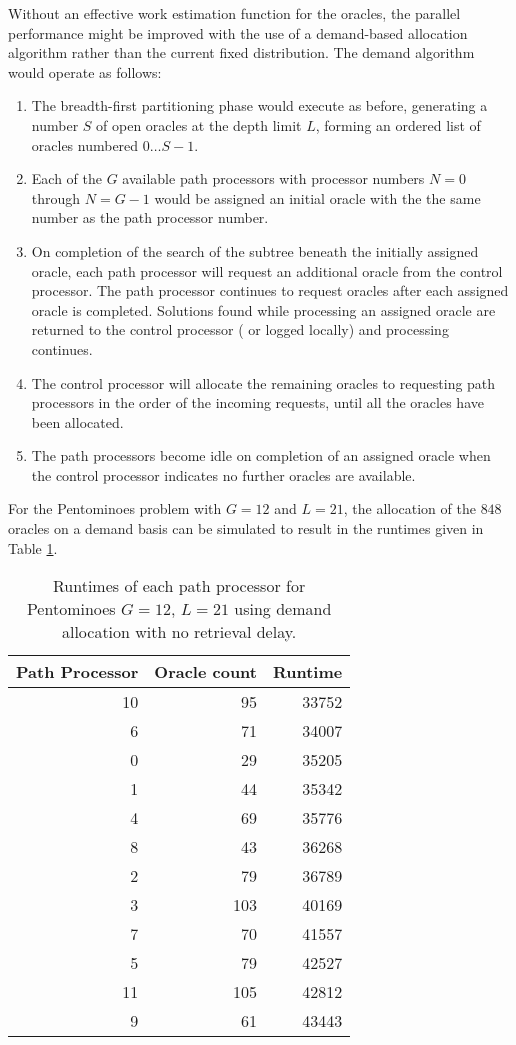 Without an effective work estimation function for the oracles, the parallel
performance might be improved with the use of a demand-based allocation algorithm
rather than the current fixed distribution.  The demand algorithm would operate as
follows:
\begin{enumerate}
\item{The breadth-first partitioning phase would execute as before, generating
  a number $S$ of open oracles at the depth limit $L$, forming an ordered list of
  oracles numbered $0\ldots S-1$.}
\item{Each of the $G$ available path processors with processor numbers $N=0$ through $N=G-1$ would
  be assigned an initial oracle with the the same number as the path processor number.}
\item{On completion of the search of the subtree beneath the initially assigned oracle, each
  path processor will request an additional oracle from the control processor.  The path
  processor continues to request oracles after each assigned oracle is completed.
  Solutions found while processing an assigned oracle are returned to the control processor (
  or logged locally) and processing continues.}
\item{The control processor will allocate the remaining oracles to requesting path processors in
  the order of the incoming requests, until all the oracles have been allocated.}
\item{The path processors become idle on completion of an assigned oracle when the control
  processor indicates no further oracles are available.}
\end{enumerate}

For the Pentominoes problem with $G=12$ and $L=21$, the allocation of the $848$ oracles on
a demand basis can be simulated to result in the runtimes given in Table \ref{pent_demand0}.

\begin{table}[htbp]
{\small
\begin{tabular}{| r | r | r |}
\hline
\textbf{Path Processor} & \textbf{Oracle count} & \textbf{Runtime} \\
\hline
10 & 95  & 33752 \\
6  & 71  & 34007 \\
0  & 29  & 35205 \\
1  & 44  & 35342 \\
4  & 69  & 35776 \\
8  & 43  & 36268 \\
2  & 79  & 36789 \\
3  & 103 & 40169 \\
7  & 70  & 41557 \\
5  & 79  & 42527 \\
11 & 105 & 42812 \\
9  & 61  & 43443 \\
\hline
\end{tabular}
}
\caption{Runtimes of each path processor for Pentominoes $G=12$, $L=21$ using demand allocation
  with no retrieval delay.}
\label{pent_demand0}
\end{table}

